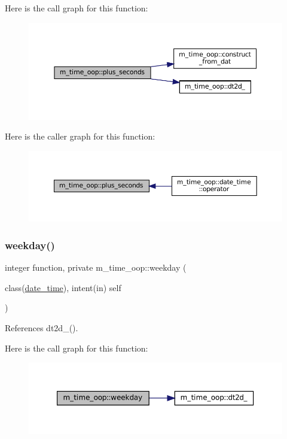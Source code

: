 Here is the call graph for this function\+:\nopagebreak
\begin{figure}[H]
\begin{center}
\leavevmode
\includegraphics[width=350pt]{namespacem__time__oop_a6830c1cce303ec401ac8e4333a5a73d4_cgraph}
\end{center}
\end{figure}
Here is the caller graph for this function\+:\nopagebreak
\begin{figure}[H]
\begin{center}
\leavevmode
\includegraphics[width=350pt]{namespacem__time__oop_a6830c1cce303ec401ac8e4333a5a73d4_icgraph}
\end{center}
\end{figure}
\mbox{\label{namespacem__time__oop_ad290beea1dd0dc3d34486e8b4cd8a86c}} 
\subsubsection{\texorpdfstring{weekday()}{weekday()}}
{\footnotesize\ttfamily integer function, private m\+\_\+time\+\_\+oop\+::weekday (\begin{DoxyParamCaption}\item[{class(\mbox{\hyperlink{structm__time__oop_1_1date__time}{date\+\_\+time}}), intent(in)}]{self }\end{DoxyParamCaption})\hspace{0.3cm}{\ttfamily [private]}}



References dt2d\+\_\+().

Here is the call graph for this function\+:\nopagebreak
\begin{figure}[H]
\begin{center}
\leavevmode
\includegraphics[width=350pt]{namespacem__time__oop_ad290beea1dd0dc3d34486e8b4cd8a86c_cgraph}
\end{center}
\end{figure}
